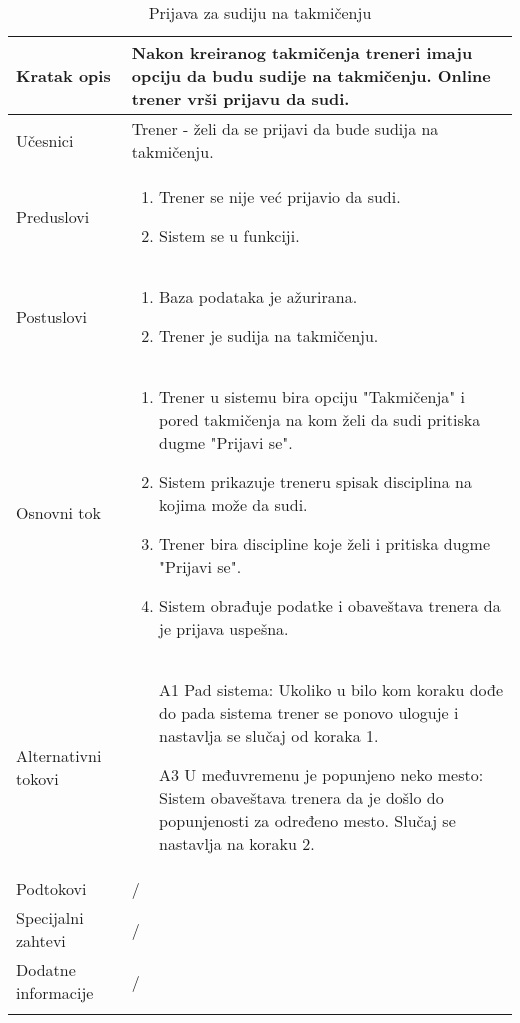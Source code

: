 \documentclass[../../main.tex]{subfiles}
\begin{document}
\begin{longtable}{| p{} | p{} |} 
\hline
    Kratak opis & Nakon kreiranog takmičenja treneri imaju opciju da budu sudije na takmičenju. Online trener vrši prijavu da sudi. \\ 
\hline    
    Učesnici & Trener - želi da se prijavi da bude sudija na takmičenju.\\
\hline
   Preduslovi & \begin{enumerate}
       \item Trener se nije već prijavio da sudi.
       \item Sistem se u funkciji.
   \end{enumerate}\\
\hline  
    Postuslovi & \begin{enumerate}
        \item Baza podataka je ažurirana.
        \item Trener je sudija na takmičenju.
    \end{enumerate}\\
\hline
    Osnovni tok & \begin{enumerate}
        \item Trener u sistemu bira opciju "Takmičenja" i pored takmičenja na kom želi da sudi pritiska dugme "Prijavi se".
        \item Sistem prikazuje treneru spisak disciplina na kojima može da sudi.
        \item Trener bira discipline koje želi i pritiska dugme "Prijavi se".
        \item Sistem obrađuje podatke i obaveštava trenera da je prijava uspešna.
    \end{enumerate}\\
\hline
    Alternativni tokovi & \begin{itemize}
        \item[A1] Pad sistema: Ukoliko u bilo kom koraku dođe do pada sistema trener se ponovo uloguje i nastavlja se slučaj od koraka 1.
        \item[A3] U međuvremenu je popunjeno neko mesto: Sistem obaveštava trenera da je došlo do popunjenosti za određeno mesto. Slučaj se nastavlja na koraku 2.
    \end{itemize}\\
\hline
    Podtokovi & /\\
\hline
    Specijalni zahtevi & /\\
\hline
    Dodatne informacije & /\\
\hline
\caption{Prijava za sudiju na takmičenju} %
\end{longtable}
\end{document}
